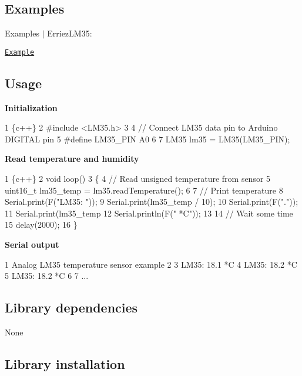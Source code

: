 \subsection*{Examples}

Examples $\vert$ Erriez\+L\+M35\+:


\begin{DoxyItemize}
\item \href{https://github.com/Erriez/ErriezLM35/blob/master/examples/Example/Example.ino}{\tt Example}
\end{DoxyItemize}

\subsection*{Usage}

{\bfseries Initialization}


\begin{DoxyCode}
1 \{c++\}
2 #include <LM35.h>
3 
4 // Connect LM35 data pin to Arduino DIGITAL pin
5 #define LM35\_PIN   A0
6 
7 LM35 lm35 = LM35(LM35\_PIN);
\end{DoxyCode}


{\bfseries Read temperature and humidity}


\begin{DoxyCode}
1 \{c++\}
2 void loop()
3 \{
4   // Read unsigned temperature from sensor
5   uint16\_t lm35\_temp = lm35.readTemperature();
6 
7   // Print temperature
8   Serial.print(F("LM35: "));
9   Serial.print(lm35\_temp / 10);
10   Serial.print(F("."));
11   Serial.print(lm35\_temp %
12   Serial.println(F(" *C"));
13 
14   // Wait some time
15   delay(2000);
16 \}
\end{DoxyCode}


{\bfseries Serial output}


\begin{DoxyCode}
1 Analog LM35 temperature sensor example
2 
3 LM35: 18.1 *C
4 LM35: 18.2 *C
5 LM35: 18.2 *C
6 
7 ...
\end{DoxyCode}


\subsection*{Library dependencies}


\begin{DoxyItemize}
\item None
\end{DoxyItemize}

\subsection*{Library installation}

